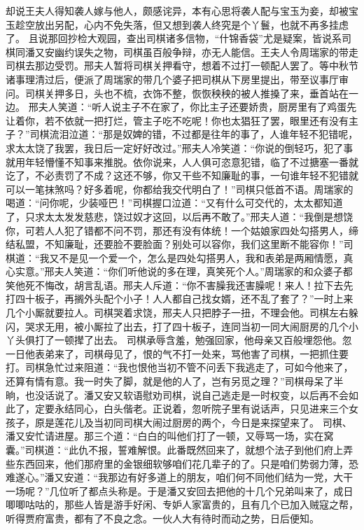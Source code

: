 \documentclass[12pt,oneside]{book}
\begin{document}
却说王夫人得知袭人嫁与他人，颇感诧异，本有心思将袭人配与宝玉为妾，却被宝玉趁空放出另配，心内不免失落，但又想到袭人终究是个丫鬟，也就不再多挂虑了。
且说那回抄检大观园，查出司棋诸多信物，“什锦香袋”尤是疑案，皆说系司棋同潘又安幽约误失之物，司棋虽百般争辩，亦无人能信。王夫人令周瑞家的带走司棋去那边受罚。邢夫人暂将司棋关押看守，想着不过打一顿配人罢了。等中秋节诸事理清过后，便派了周瑞家的带几个婆子把司棋从下房里提出，带至议事厅审问。司棋关押多日，头也不梳，衣饰不整，恢恢秧秧的被人推搡了来，垂首站在一边。
邢夫人笑道：“听人说主子不在家了，你比主子还要娇贵，厨房里有了鸡蛋先让着你，若不依就一把打烂，管主子吃不吃呢！你也太猖狂了罢，眼里还有没有主子？”司棋流泪泣道：“那是奴婢的错，不过都是往年的事了，人谁年轻不犯错呢，求太太饶了我罢，我日后一定好好改过。”邢夫人冷笑道：“你说的倒轻巧，犯了事就用年轻懵懂不知事来推脱。依你说来，人人俱可恣意犯错，临了不过搪塞一番就讫了，不必责罚了不成？这还不够，你又干些不知廉耻的事，一句谁年轻不犯错就可以一笔抹煞吗？好多着呢，你都给我交代明白了！”司棋只低首不语。周瑞家的喝道：“问你呢，少装哑巴！”司棋握口泣道：“又有什么可交代的，太太都知道了，只求太太发发慈悲，饶过奴才这回，以后再不敢了。”邢夫人道：“我倒是想饶你，可若人人犯了错都不问不罚，那还有没有体统！一个姑娘家四处勾搭男人，缔结私盟，不知廉耻，还要脸不要脸面？别处可以容你，我们这里断不能容你！”司棋道：“我又不是见一个爱一个，怎么是四处勾搭男人，我和表弟是两厢情愿，真心实意。”邢夫人笑道：“你们听他说的多在理，真笑死个人。”周瑞家的和众婆子都笑他死不悔改，胡言乱语。邢夫人斥道：“你不害臊我还害臊呢！来人！拉下去先打四十板子，再搁外头配个小子！人人都自己找女婿，还不乱了套了？”一时上来几个小厮就要拉人。司棋哭着求饶，邢夫人只把脖子一扭，不理会他。司棋左右躲闪，哭求无用，被小厮拉了出去，打了四十板子，连同当初一同大闹厨房的几个小丫头俱打了一顿撵了出去。
司棋承辱含羞，勉强回家，他母亲又百般埋怨他。忽一日他表弟来了，司棋母见了，恨的气不打一处来，骂他害了司棋，一把抓住要打。司棋急忙过来阻道：“我也恨他当初不管不问丢下我逃走了，可如今他来了，还算有情有意。我一时失了脚，就是他的人了，岂有另觅之理？”司棋母呆了半晌，也没话说了。潘又安又软语慰劝司棋，说自己逃走是一时权变，以后再不会如此了，定要永结同心，白头偕老。正说着，忽听院子里有说话声，只见进来三个女孩子，原是莲花儿及当初同司棋大闹过厨房的两个，今日是来探望来了。
司棋、潘又安忙请进屋。那三个道：“白白的叫他们打了一顿，又辱骂一场，实在窝囊。”司棋道：“此仇不报，誓难解恨。此番既然回来了，就想个法子到他们府上弄些东西回来，他们那府里的金银细软够咱们花几辈子的了。只是咱们势弱力薄，恐难遂心。”潘又安道：“我那边有好多道上的朋友，咱们何不同他们结为一党，大干一场呢？”几位听了都点头称是。于是潘又安回去把他的十几个兄弟叫来了，成日唧唧咕咕的，那些人皆是游手好闲、专妒人家富贵的，且有几个已加入贼寇之帮，听得贾府富贵，都有了不良之念。一伙人大有待时而动之势，日后便知。
\end{document}
